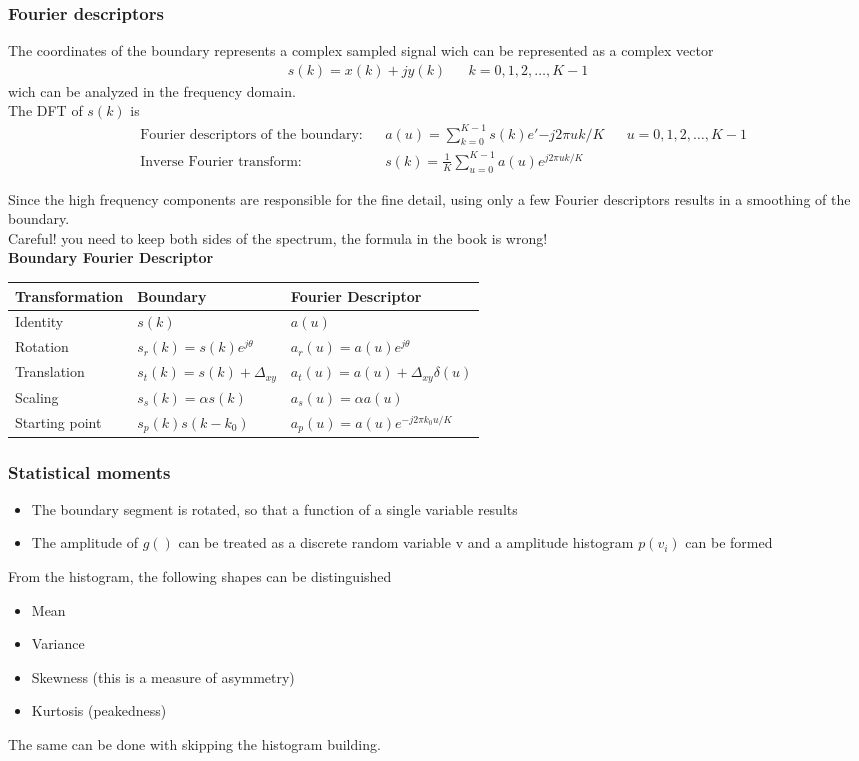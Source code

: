 \subsubsection{Fourier descriptors}
The coordinates of the boundary represents a complex sampled signal wich can be represented as a complex vector 
\begin{align*}
s(k)=x(k)+jy(k) && k=0,1,2,\ldots,K-1
\end{align*} 
wich can be analyzed in the frequency domain.\\
The DFT of $s(k)$ is \begin{align*}
& \text{Fourier descriptors of the boundary:} && a(u)=\sum\limits_{k=0}^{K-1}s(k)e'{-j2\pi uk/K} && u=0,1,2,\ldots,K-1\\
& \text{Inverse Fourier transform:} && s(k)=\frac{1}{K}\sum\limits_{u=0}^{K-1}a(u)e^{j2\pi uk/K}
\end{align*} 

Since the high frequency components are responsible for the fine detail, using only a few Fourier descriptors results in a smoothing of the boundary.\\
Careful! you need to keep both sides of the spectrum, the formula in the book is wrong!\\

\textbf{Boundary Fourier Descriptor}

\begin{tabularx}{\textwidth}{XXX}
Transformation & Boundary & Fourier Descriptor \\\hline
Identity & $s(k)$ & $a(u)$ \\
Rotation & $s_r(k)=s(k)e^{j\theta}$& $a_r(u)=a(u)e^{j\theta}$ \\
Translation &$s_t(k)=s(k)+\Delta_{xy}$& $a_t(u)=a(u)+\Delta_{xy}\delta(u)$ \\
Scaling &$s_s(k)=\alpha s(k)$& $a_s(u)=\alpha a(u)$ \\
Starting point & $s_p(k)s(k-k_0)$& $a_p(u)=a(u)e^{-j2\pi k_0u/K}$ \\
\end{tabularx}

\subsubsection{Statistical moments}
\begin{itemize}
\item The boundary segment is rotated, so that a function of a single variable results
\item The amplitude of $g()$ can be treated as a discrete random variable v and a amplitude histogram $p(v_i)$ can be formed
\end{itemize}
From the histogram, the following shapes can be distinguished
\begin{itemize}
\item Mean
\item Variance
\item Skewness (this is a measure of asymmetry)
\item Kurtosis (peakedness)
\end{itemize}
The same can be done with skipping the histogram building.

